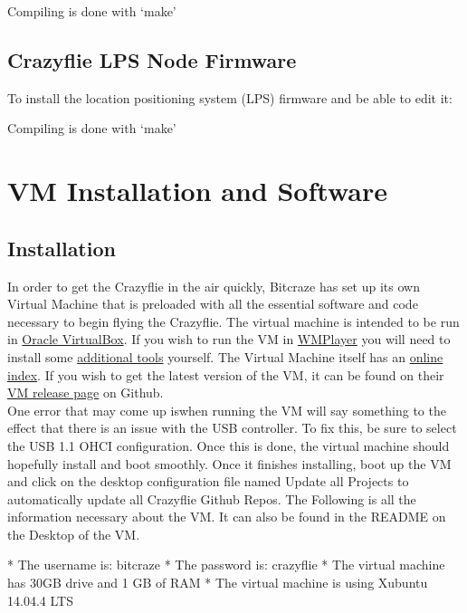 \documentclass[]{article}
\begin{document}
\noindent Compiling is done with `make'

\subsection{Crazyflie LPS Node Firmware}
\noindent To install the location positioning system (LPS) firmware and be able to edit it:


\noindent Compiling is done with `make'

\section{VM Installation and Software}
\subsection{Installation}
\noindent In order to get the Crazyflie in the air quickly, Bitcraze has set up its own Virtual Machine that is preloaded with all the essential software and code necessary to begin flying the Crazyflie. The virtual machine is intended to be run in \href{https://www.virtualbox.org/}{Oracle VirtualBox}. If you wish to run the VM in \href{https://www.vmware.com/products/workstation-player.html}{WMPlayer} you will need to install some \href{https://www.vmware.com/support/ws5/doc/ws_newguest_tools_linux.html#wp1118025}{additional tools} yourself. The Virtual Machine itself has an \href{https://wiki.bitcraze.io/projects:virtualmachine:index}{online index}. If you wish to get the latest version of the VM, it can be found on their \href{https://github.com/bitcraze/bitcraze-vm/releases/}{VM release page} on Github. \\

\noindent One error that may come up iswhen running the VM will say something to the effect that there is an issue with the USB controller. To fix this, be sure to select the USB 1.1 OHCI configuration. Once this is done, the virtual machine should hopefully install and boot smoothly. Once it finishes installing, boot up the VM and click on the desktop configuration file named Update all Projects to automatically update all Crazyflie Github Repos. The Following is all the information necessary about the VM. It can also be found in the README on the Desktop of the VM. \\
\begin{terminal}
* The username is: bitcraze
* The password is: crazyflie
* The virtual machine has 30GB drive and 1 GB of RAM
* The virtual machine is using Xubuntu 14.04.4 LTS
\end{terminal}
\end{document}
